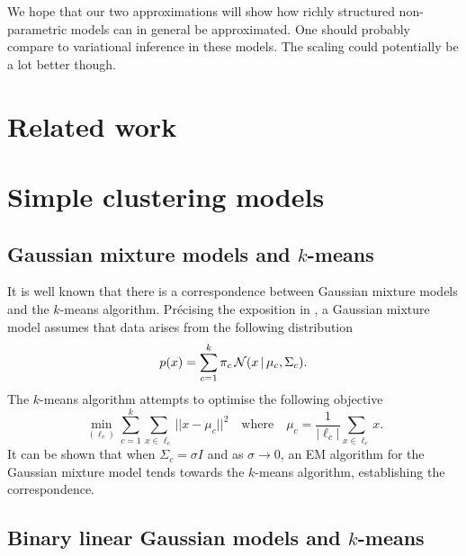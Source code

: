 \documentclass{article}
\numberwithin{equation}{section}
\numberwithin{thm}{section}
\begin{document}
We hope that our two approximations will show how richly structured non-parametric models can in general be approximated.
One should probably compare to \eg variational inference in these models.
The scaling could potentially be a lot better though.

\section{Related work}


\section{Simple clustering models}

\subsection{Gaussian mixture models and $k$-means}

It is well known that there is a correspondence between Gaussian mixture models and the $k$-means algorithm.
Pr\'ecising the exposition in \cite{Kulis2012}, a Gaussian mixture model assumes that data arises from the following distribution
\begin{equation}
p(x) = \sum_{c=1}^k \pi_c \, \mathcal{N}(x \,|\, \mu_c, \Sigma_c).
\end{equation}
The $k$-means algorithm attempts to optimise the following objective
\begin{equation}
\min_{(\ell_c)} \sum_{c=1}^k \sum_{x \in \ell_c} ||x - \mu_c||^2 \quad \textrm{where} \quad \mu_c = \frac{1}{|\ell_c|}\sum_{x \in \ell_c}x.
\end{equation}
It can be shown that when $\Sigma_c = \sigma I$ and as $\sigma \to 0$, an EM algorithm for the Gaussian mixture model tends towards the $k$-means algorithm, establishing the correspondence.

\subsection{Binary linear Gaussian models and $k$-means}
\end{document}
